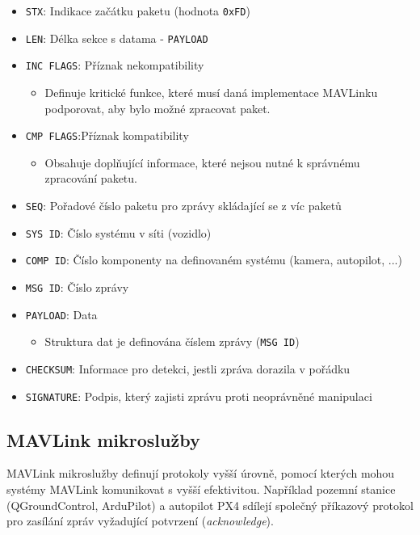 \begin{itemize}
    \item \texttt{STX}: Indikace začátku paketu (hodnota \texttt{0xFD})
    \item \texttt{LEN}: Délka sekce s datama - \texttt{PAYLOAD}
    \item \texttt{INC FLAGS}: Příznak nekompatibility
    \begin{itemize}
        \item Definuje kritické funkce, které musí daná implementace MAVLinku podporovat, aby bylo možné zpracovat paket.
    \end{itemize}
    \item \texttt{CMP FLAGS}:Příznak kompatibility
    \begin{itemize}
        \item Obsahuje doplňující informace, které nejsou nutné k správnému zpracování paketu.
    \end{itemize}
    \item \texttt{SEQ}: Pořadové číslo paketu pro zprávy skládající se z víc paketů
    \item \texttt{SYS ID}: Číslo systému v síti (vozidlo)
    \item \texttt{COMP ID}: Číslo komponenty na definovaném systému (kamera, autopilot, ...)
    \item \texttt{MSG ID}: Číslo zprávy
    \item \texttt{PAYLOAD}: Data
    \begin{itemize}
        \item Struktura dat je definována číslem zprávy (\texttt{MSG ID})
    \end{itemize}
    \item \texttt{CHECKSUM}: Informace pro detekci, jestli zpráva dorazila v pořádku
    \item \texttt{SIGNATURE}: Podpis, který zajisti zprávu proti neoprávněné manipulaci
\end{itemize}

\subsection{MAVLink mikroslužby}

MAVLink mikroslužby definují protokoly vyšší úrovně, pomocí kterých mohou systémy MAVLink komunikovat s vyšší efektivitou. Například pozemní stanice (QGroundControl, ArduPilot) a autopilot PX4 sdílejí společný příkazový protokol pro zasílání zpráv vyžadující potvrzení (\textit{acknowledge}).

